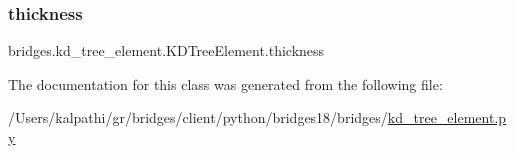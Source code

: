 \mbox{\label{classbridges_1_1kd__tree__element_1_1_k_d_tree_element_a3eb7cd079ee2f28341c5f505b5f9551a}} 
\subsubsection{\texorpdfstring{thickness}{thickness}}
{\footnotesize\ttfamily bridges.\+kd\+\_\+tree\+\_\+element.\+K\+D\+Tree\+Element.\+thickness}



The documentation for this class was generated from the following file\+:\begin{DoxyCompactItemize}
\item 
/\+Users/kalpathi/gr/bridges/client/python/bridges18/bridges/\mbox{\hyperlink{kd__tree__element_8py}{kd\+\_\+tree\+\_\+element.\+py}}\end{DoxyCompactItemize}
